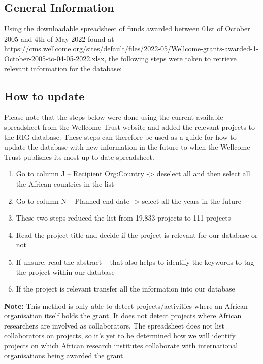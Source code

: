 \documentclass[
]{book}
\begin{document}
\hypertarget{general-information}{%
\subsection{General Information}\label{general-information}}

Using the downloadable spreadsheet of funds awarded between 01st of October 2005 and 4th of May 2022 found at \url{https://cms.wellcome.org/sites/default/files/2022-05/Wellcome-grants-awarded-1-October-2005-to-04-05-2022.xlsx}, the following steps were taken to retrieve relevant information for the database:

\hypertarget{how-to-update}{%
\subsection{How to update}\label{how-to-update}}

Please note that the steps below were done using the current available spreadsheet from the Wellcome Trust website and added the relevant projects to the RIG database. These steps can therefore be used as a guide for how to update the database with new information in the future to when the Wellcome Trust publishes its most up-to-date spreadsheet.

\begin{enumerate}
\def\labelenumi{\arabic{enumi}.}
\item
  Go to column J -- Recipient Org:Country -\textgreater{} deselect all and then select all the African countries in the list
\item
  Go to column N -- Planned end date -\textgreater{} select all the years in the future
\item
  These two steps reduced the list from 19,833 projects to 111 projects
\item
  Read the project title and decide if the project is relevant for our database or not
\item
  If unsure, read the abstract -- that also helps to identify the keywords to tag the project within our database
\item
  If the project is relevant transfer all the information into our database
\end{enumerate}

\textbf{Note:} This method is only able to detect projects/activities where an African organisation itself holds the grant. It does not detect projects where African researchers are involved as collaborators. The spreadsheet does not list collaborators on projects, so it's yet to be determined how we will identify projects on which African research institutes collaborate with international organisations being awarded the grant.
\end{document}
